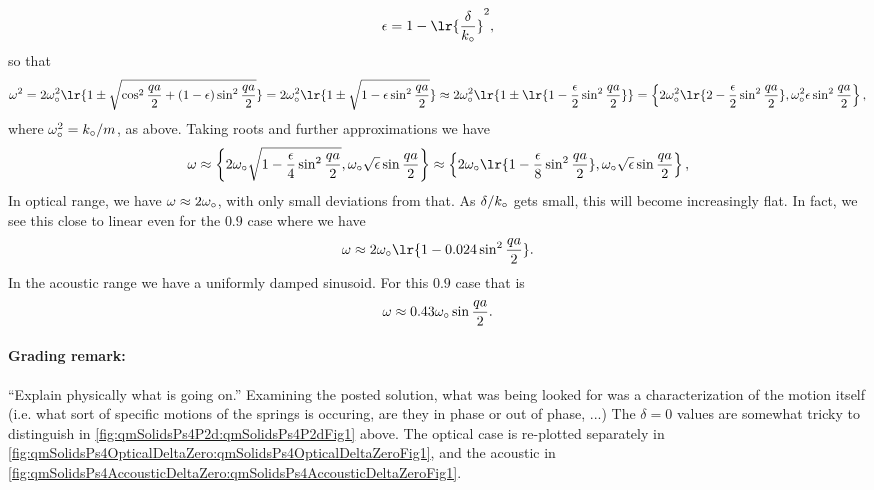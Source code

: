 {\begin{dmath}
\epsilon = 1 - \lr{\frac{\delta}{k_\nought}}^2,
\end{dmath}
%
so that
%
\begin{dmath}\label{eqn:condensedMatterProblemSet4Problem2:760}
\omega^2
= 2 \omega_\nought^2 \lr{ 1 \pm \sqrt{ \cos^2\frac{qa}{2} + (1 - \epsilon) \sin^2 \frac{qa}{2}} }
= 2 \omega_\nought^2 \lr{ 1 \pm \sqrt{ 1 - \epsilon \sin^2 \frac{qa}{2}} }
\approx 2 \omega_\nought^2 \lr{ 1 \pm \lr{ 1 - \frac{\epsilon}{2} \sin^2 \frac{qa}{2}} }
=
\left\{2 \omega_\nought^2 \lr{ 2 - \frac{\epsilon}{2} \sin^2 \frac{qa}{2} },
\omega_\nought^2 \epsilon \sin^2 \frac{qa}{2}
\right\},
\end{dmath}
%
where \(\omega_\circ^2 = k_\circ/m\), as above.  Taking roots and further approximations we have
%
\begin{dmath}\label{eqn:condensedMatterProblemSet4Problem2:780}
\omega
\approx
\left\{2 \omega_\nought \sqrt{ 1 - \frac{\epsilon}{4} \sin^2 \frac{qa}{2} },
\omega_\nought \sqrt{\epsilon} \sin \frac{qa}{2}
\right\}
\approx
\left\{
2 \omega_\nought \lr{ 1 - \frac{\epsilon}{8} \sin^2 \frac{qa}{2} },
\omega_\nought \sqrt{\epsilon} \sin \frac{qa}{2}
\right\},
\end{dmath}
%
In optical  range, we have \(\omega \approx 2 \omega_\circ\), with only small deviations from that.  As \(\delta/k_\circ\) gets small, this will become increasingly flat.  In fact, we see this close to linear even for the \(0.9\) case where we have
%
\begin{dmath}\label{eqn:condensedMatterProblemSet4Problem2:800}
\omega \approx
2 \omega_\nought \lr{ 1 - 0.024 \sin^2 \frac{qa}{2} }.
\end{dmath}
%
In the acoustic  range we have a uniformly damped sinusoid.  For this \(0.9\) case that is
%
\begin{dmath}\label{eqn:condensedMatterProblemSet4Problem2:720}
\omega \approx 0.43 \omega_\nought \sin \frac{qa}{2}.
\end{dmath}
%
\paragraph{Grading remark:} ``Explain physically what is going on.''  Examining the posted solution, what was being looked for was a characterization of the motion itself (i.e. what sort of specific motions of the springs is occuring, are they in phase or out of phase, ...)
The \(\delta = 0\) values are somewhat tricky to distinguish in \cref{fig:qmSolidsPs4P2d:qmSolidsPs4P2dFig1} above.  The optical case is re-plotted separately in \cref{fig:qmSolidsPs4OpticalDeltaZero:qmSolidsPs4OpticalDeltaZeroFig1}, and the acoustic in \cref{fig:qmSolidsPs4AccousticDeltaZero:qmSolidsPs4AccousticDeltaZeroFig1}.
%
}
